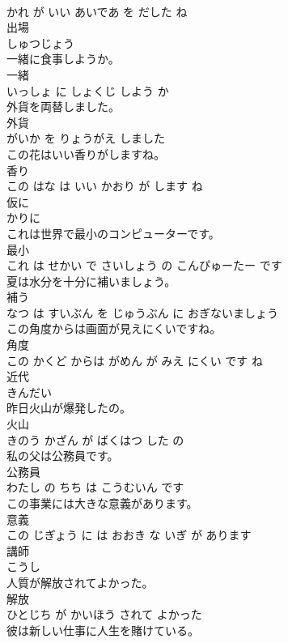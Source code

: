 \documentclass[8pt]{extreport}
\begin{document}
\begin{CJK}{UTF8}{min}
\\	かれ が いい あいであ を だした ね			
\\	出場	
\\	しゅつじょう			
\\	一緒に食事しようか。	
\\	一緒 
\\	いっしょ に しょくじ しよう か			
\\	外貨を両替しました。	
\\	外貨 
\\	がいか を りょうがえ しました			
\\	この花はいい香りがしますね。	
\\	香り 
\\	この はな は いい かおり が します ね			
\\	仮に	
\\	かりに			
\\	これは世界で最小のコンピューターです。	
\\	最小 
\\	これ は せかい で さいしょう の こんぴゅーたー です			
\\	夏は水分を十分に補いましょう。	
\\	補う 
\\	なつ は すいぶん を じゅうぶん に おぎないましょう			
\\	この角度からは画面が見えにくいですね。	
\\	角度 
\\	この かくど からは がめん が みえ にくい です ね			
\\	近代	
\\	きんだい			
\\	昨日火山が爆発したの。	
\\	火山 
\\	きのう かざん が ばくはつ した の			
\\	私の父は公務員です。	
\\	公務員 
\\	わたし の ちち は こうむいん です			
\\	この事業には大きな意義があります。	
\\	意義 
\\	この じぎょう に は おおき な いぎ が あります			
\\	講師	
\\	こうし			
\\	人質が解放されてよかった。	
\\	解放 
\\	ひとじち が かいほう されて よかった			
\\	彼は新しい仕事に人生を賭けている。	

\end{CJK}
\end{document}
